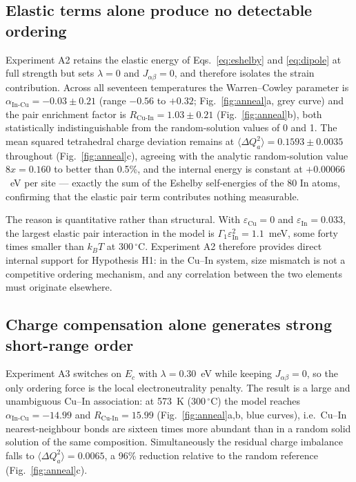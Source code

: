 \documentclass[11pt,a4paper]{article}
\newcommand{\dQ}{\Delta Q}
\newcommand{\aInCu}{\alpha_{\mathrm{In\text{-}Cu}}}
\newcommand{\RCuIn}{R_{\mathrm{Cu\text{-}In}}}
\begin{document}
\subsection{Elastic terms alone produce no detectable ordering}
\label{sec:elastic}

Experiment A2 retains the elastic energy of Eqs.~\eqref{eq:eshelby} and
\eqref{eq:dipole} at full strength but sets $\lambda = 0$ and
$J_{\alpha\beta} = 0$, and therefore isolates the strain contribution. Across
all seventeen temperatures the Warren--Cowley parameter is
$\aInCu = -0.03 \pm 0.21$ (range $-0.56$ to $+0.32$; Fig.~\ref{fig:anneal}a,
grey curve) and the pair enrichment factor is $\RCuIn = 1.03 \pm 0.21$
(Fig.~\ref{fig:anneal}b), both statistically indistinguishable from the
random-solution values of 0 and 1. The mean squared tetrahedral charge deviation
remains at $\langle \dQ_a^2 \rangle = 0.1593 \pm 0.0035$ throughout
(Fig.~\ref{fig:anneal}c), agreeing with the analytic random-solution value
$8x = 0.160$ to better than 0.5\%, and the internal energy is constant at
$+0.00066$~eV per site --- exactly the sum of the Eshelby self-energies of the 80
In atoms, confirming that the elastic pair term contributes nothing measurable.

The reason is quantitative rather than structural. With
$\varepsilon_{\mathrm{Cu}} = 0$ and $\varepsilon_{\mathrm{In}} = 0.033$, the
largest elastic pair interaction in the model is
$\Gamma_1 \varepsilon_{\mathrm{In}}^2 = 1.1$~meV, some forty times smaller than
$k_BT$ at $300\,^\circ$C. Experiment A2 therefore provides direct internal
support for Hypothesis H1: in the Cu--In system, size mismatch is not a
competitive ordering mechanism, and any correlation between the two elements
must originate elsewhere.

\subsection{Charge compensation alone generates strong short-range order}

Experiment A3 switches on $E_c$ with $\lambda = 0.30$~eV while keeping
$J_{\alpha\beta} = 0$, so the only ordering force is the local electroneutrality
penalty. The result is a large and unambiguous Cu--In association: at 573~K
($300\,^\circ$C) the model reaches $\aInCu = -14.99$ and $\RCuIn = 15.99$
(Fig.~\ref{fig:anneal}a,b, blue curves), i.e.\ Cu--In nearest-neighbour bonds
are sixteen times more abundant than in a random solid solution of the same
composition. Simultaneously the residual charge imbalance falls to
$\langle \dQ_a^2 \rangle = 0.0065$, a 96\% reduction relative to the random
reference (Fig.~\ref{fig:anneal}c).
\end{document}
